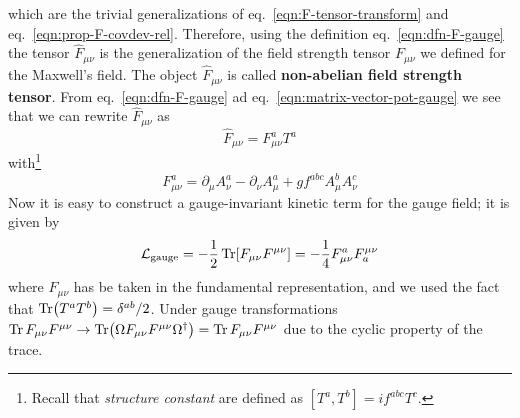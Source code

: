 \documentclass[TheoreticalPhy_ModB.tex]{subfiles}
\begin{document}
which are the trivial generalizations of eq.~\eqref{eqn:F-tensor-transform} and eq.~\eqref{eqn:prop-F-covdev-rel}.
Therefore, using the definition eq.~\eqref{eqn:dfn-F-gauge} the tensor $\hat F_{\mu\nu}$ is the generalization of the field strength tensor $F_{\mu\nu}$ we defined for the Maxwell's field. The object $\hat F_{\mu\nu}$ is called \textbf{non-abelian field strength tensor}. From eq.~\eqref{eqn:dfn-F-gauge} ad eq.~\eqref{eqn:matrix-vector-pot-gauge} we see that we can rewrite $\hat F_{\mu\nu}$ as
\[\hat F_{\mu\nu}= F_{\mu\nu}^a T^a\]
with\footnote{Recall that \emph{structure constant} are defined as $[T^a,T^b]=if^{abc}T^c$.}
\begin{equation}\label{eqn:deco-F-tensor}
F_{\mu\nu}^a=\partial_\mu A_\nu^a-\partial_\nu A_\mu^a+gf^{abc}A_\mu^bA_\nu^c
\end{equation}
Now it is easy to construct a gauge-invariant kinetic term for the gauge field; it is given by
\[\mathcal L_{\text{gauge}}=-\frac12\Tr[F_{\mu\nu}F^{\mu\nu}]=-\frac14F_{\mu\nu}^aF^{\mu\nu}_a\]
where $F_{\mu\nu}$ has be taken in the fundamental representation, and we used the fact that $\Tr(T^aT^b)=\delta^{ab}/2$. Under gauge transformations $\Tr F_{\mu\nu}F^{\mu\nu}\to \Tr (\Omega F_{\mu\nu}F^{\mu\nu}\Omega^\dagger)=\Tr F_{\mu\nu}F^{\mu\nu}$ due to the cyclic property of the trace. 
\end{document}
